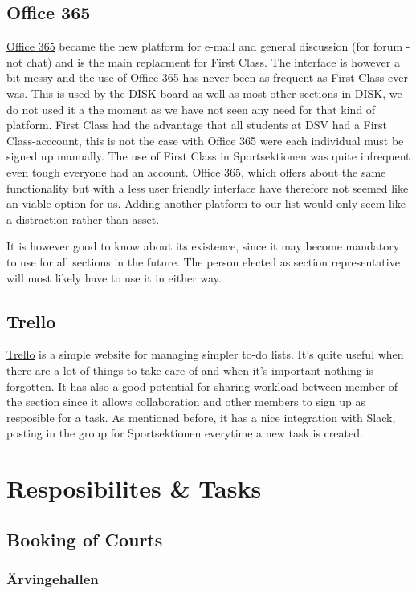 \documentclass[12pt,a4paper]{article}
\begin{document}
		\subsection{Office 365}
			\href{http://portal.office.com}{Office 365} became the new platform for e-mail and general discussion (for forum - not chat) and is the main replacment for First Class. The interface is however a bit messy and the use of Office 365 has never been as frequent as First Class ever was. This is used by the DISK board as well as most other sections in DISK, we do not used it a the moment as we have not seen any need for that kind of platform. First Class had the advantage that all students at DSV had a First Class-acccount, this is not the case with Office 365 were each individual must be signed up manually. The use of First Class in Sportsektionen was quite infrequent even tough everyone had an account. Office 365, which offers about the same functionality but with a less user friendly interface have therefore not seemed like an viable option for us. Adding another platform to our list would only seem like a distraction rather than asset.

			It is however good to know about its existence, since it may become mandatory to use for all sections in the future. The person elected as section representative will most likely have to use it in either way.
		\subsection{Trello}
			\href{https://trello.com/b/ez76bD5J/sportsektionen}{Trello} is a simple website for managing simpler to-do lists. It's quite useful when there are a lot of things to take care of and when it's important nothing is forgotten. It has also a good potential for sharing workload between member of the section since it allows collaboration and other members to sign up as resposible for a task. As mentioned before, it has a nice integration with Slack, posting in the group for Sportsektionen everytime a new task is created.

	\section{Resposibilites \& Tasks}
		\subsection{Booking of Courts}
			\subsubsection{Ärvingehallen}
\end{document}
